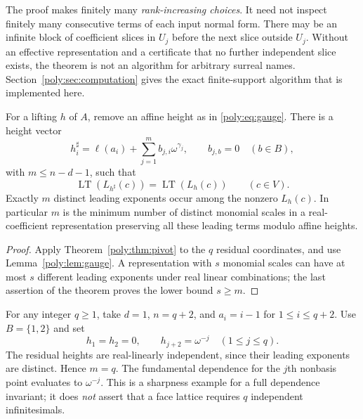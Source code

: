 \documentclass[11pt,a4paper]{article}
\numberwithin{equation}{section}
\theoremstyle{plain}
\newcommand{\LT}{\operatorname{LT}}
\begin{document}
\begin{remark}
The proof makes finitely many \emph{rank-increasing choices}. It need not
inspect finitely many consecutive terms of each input normal form. There
may be an infinite block of coefficient slices in $U_j$ before the next
slice outside $U_j$. Without an effective representation and a certificate
that no further independent slice exists, the theorem is not an algorithm
for arbitrary surreal names. Section~\ref{poly:sec:computation} gives the exact
finite-support algorithm that is implemented here.
\end{remark}

\begin{corollary}\label{poly:cor:height}
For a lifting $h$ of $A$, remove an affine height as in
\eqref{poly:eq:gauge}. There is a height vector
\[
 h^\sharp_i=\ell(a_i)+\sum_{j=1}^m b_{j,i}\omega^{\gamma_j},
 \qquad b_{j,b}=0\quad(b\in B),
\]
with $m\le n-d-1$, such that
\[
 \LT(L_{h^\sharp}(c))=\LT(L_h(c))\qquad(c\in V).
\]
Exactly $m$ distinct leading exponents occur among the nonzero $L_h(c)$.
In particular $m$ is the minimum number of distinct monomial scales in a
real-coefficient representation preserving all these leading terms modulo
affine heights.
\end{corollary}
\begin{proof}
Apply Theorem~\ref{poly:thm:pivot} to the $q$ residual coordinates, and use
Lemma~\ref{poly:lem:gauge}. A representation with $s$ monomial scales can have
at most $s$ different leading exponents under real linear combinations;
the last assertion of the theorem proves the lower bound $s\ge m$.
\end{proof}

\begin{example}\label{poly:ex:sharp}
For any integer $q\ge1$, take $d=1$, $n=q+2$, and $a_i=i-1$ for
$1\le i\le q+2$. Use $B=\{1,2\}$ and set
\[
 h_1=h_2=0,\qquad h_{j+2}=\omega^{-j}\quad(1\le j\le q).
\]
The residual heights are real-linearly independent, since their leading
exponents are distinct. Hence $m=q$. The fundamental dependence for the
$j$th nonbasis point evaluates to $\omega^{-j}$. This is a sharpness
example for a full dependence invariant; it does \emph{not} assert that a
face lattice requires $q$ independent infinitesimals.
\end{example}
\end{document}
